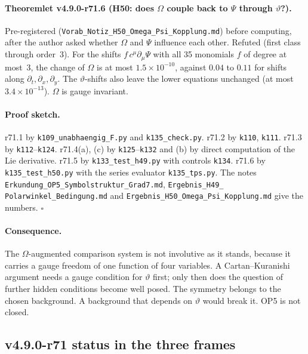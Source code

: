 \paragraph{Theoremlet v4.9.0-r71.6 (H50: does \(\Omega\) couple back to \(\Psi\) through \(\vartheta\)?).}
Pre-registered (\texttt{Vorab\_Notiz\_H50\_Omega\_Psi\_Kopplung.md}) before computing, after the author asked whether \(\Omega\) and
\(\Psi\) influence each other.  Refuted (first class through order~3).  For the shifts \(f\,c^\mu\partial_\mu\Psi\) with all 35
monomials \(f\) of degree at most~3, the change of \(\Omega\) is at most \(1.5\times10^{-10}\), against \(0.04\) to \(0.11\) for
shifts along \(\partial_t,\partial_x,\partial_y\).  The \(\vartheta\)-shifts also leave the lower equations unchanged (at most
\(3.4\times10^{-13}\)).  \(\Omega\) is gauge invariant.

\paragraph{Proof sketch.}
r71.1 by \texttt{k109\_unabhaengig\_F.py} and \texttt{k135\_check.py}.  r71.2 by \texttt{k110}, \texttt{k111}.  r71.3 by
\texttt{k112}--\texttt{k124}.  r71.4(a), (c) by \texttt{k125}--\texttt{k132} and (b) by direct computation of the Lie derivative.
r71.5 by \texttt{k133\_test\_h49.py} with controls \texttt{k134}.  r71.6 by \texttt{k135\_test\_h50.py} with the series evaluator
\texttt{k135\_tps.py}.  The notes \texttt{Erkundung\_OP5\_Symbolstruktur\_Grad7.md}, \texttt{Ergebnis\_H49\_\allowbreak
Polarwinkel\_\allowbreak Bedingung.md} and \texttt{Ergebnis\_H50\_\allowbreak Omega\_\allowbreak Psi\_\allowbreak Kopplung.md}
give the numbers.  \(\square\)

\paragraph{Consequence.}
The \(\Omega\)-augmented comparison system is not involutive as it stands, because it carries a gauge freedom of one function of
four variables.  A Cartan--Kuranishi argument needs a gauge condition for \(\vartheta\) first; only then does the question of
further hidden conditions become well posed.  The symmetry belongs to the chosen background.  A background that depends on
\(\vartheta\) would break it.  OP5 is not closed.

\subsection*{v4.9.0-r71 status in the three frames}
\label{subsec:v490-r71-frames}

